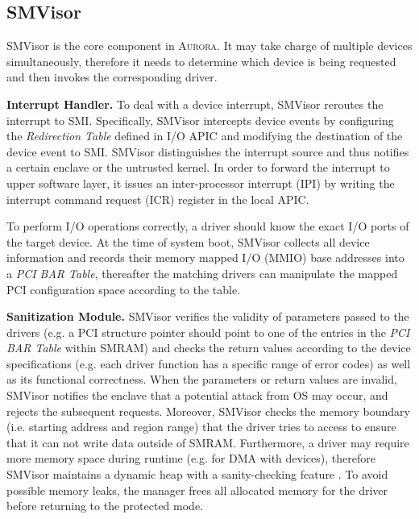 \subsection{SMVisor}\label{ssv}

SMVisor is the core component in \textsc{Aurora}.  It may take charge of multiple devices simultaneously, therefore it needs to determine which device is being requested and then invokes the corresponding driver. 

\textbf{Interrupt Handler.} To deal with a device interrupt, SMVisor reroutes the interrupt to SMI. Specifically, SMVisor intercepts device events by configuring the \textit{Redirection Table} defined in I/O APIC and modifying the destination of the device event to SMI. SMVisor distinguishes the interrupt source and thus notifies a certain enclave or the untrusted kernel. In order to forward the interrupt to upper software layer, it issues an inter-processor interrupt (IPI) by writing the interrupt command request (ICR) register in the local APIC. 

To perform I/O operations correctly, a driver should know the exact I/O ports of the target device. At the time of system boot, SMVisor collects all device information and records their memory mapped I/O (MMIO) base addresses into a \emph{PCI BAR Table}, thereafter the matching drivers can manipulate the mapped PCI configuration space according to the table.

\textbf{Sanitization Module.}\label{shield}
SMVisor verifies the validity of parameters passed to the drivers (e.g. a PCI structure pointer should point to one of the entries in the \emph{PCI BAR Table} within SMRAM) and checks the return values according to the device specifications (e.g. each driver function has a specific range of error codes) as well as its functional correctness. When the parameters or return values are invalid, SMVisor notifies the enclave that a potential attack from OS may occur, and rejects the subsequent requests. Moreover, SMVisor checks the memory boundary (i.e. starting address and region range) that the driver tries to access to ensure that it can not write data outside of SMRAM. Furthermore, a driver may require more memory space during runtime (e.g. for DMA with devices), therefore SMVisor maintains a dynamic heap with a sanity-checking feature \cite{DBLP:conf/ccs/SilvestroLCLL17}. To avoid possible memory leaks, the manager frees all allocated memory for the driver before returning to the protected mode.

